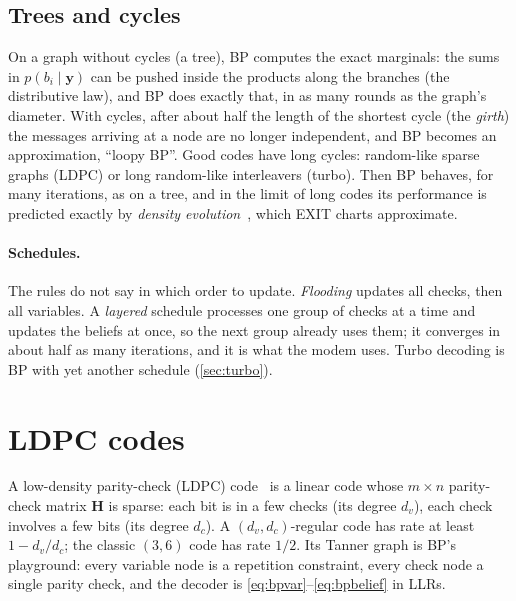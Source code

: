 \documentclass[11pt,a4paper]{article}
\theoremstyle{definition}
\theoremstyle{remark}
\begin{document}
\subsection{Trees and cycles}

On a graph without cycles (a tree), BP computes the exact marginals: the sums in $p(b_i\mid\bm{y})$ can be pushed inside the products along the branches (the distributive law), and BP does exactly that, in as many rounds as the graph's diameter. With cycles, after about half the length of the shortest cycle (the \emph{girth}) the messages arriving at a node are no longer independent, and BP becomes an approximation, ``loopy BP''. Good codes have long cycles: random-like sparse graphs (LDPC) or long random-like interleavers (turbo). Then BP behaves, for many iterations, as on a tree, and in the limit of long codes its performance is predicted exactly by \emph{density evolution}~\cite{richardson}, which EXIT charts approximate.

\paragraph{Schedules.} The rules do not say in which order to update. \emph{Flooding} updates all checks, then all variables. A \emph{layered} schedule processes one group of checks at a time and updates the beliefs at once, so the next group already uses them; it converges in about half as many iterations, and it is what the modem uses. Turbo decoding is BP with yet another schedule (\cref{sec:turbo}).

\section{LDPC codes}
\label{sec:ldpc}

A low-density parity-check (LDPC) code~\cite{gallager,mackay} is a linear code whose $m\times n$ parity-check matrix $\bm{H}$ is sparse: each bit is in a few checks (its degree $d_v$), each check involves a few bits (its degree $d_c$). A $(d_v,d_c)$-regular code has rate at least $1-d_v/d_c$; the classic $(3,6)$ code has rate $1/2$. Its Tanner graph is BP's playground: every variable node is a repetition constraint, every check node a single parity check, and the decoder is \eqref{eq:bpvar}--\eqref{eq:bpbelief} in LLRs.
\end{document}
